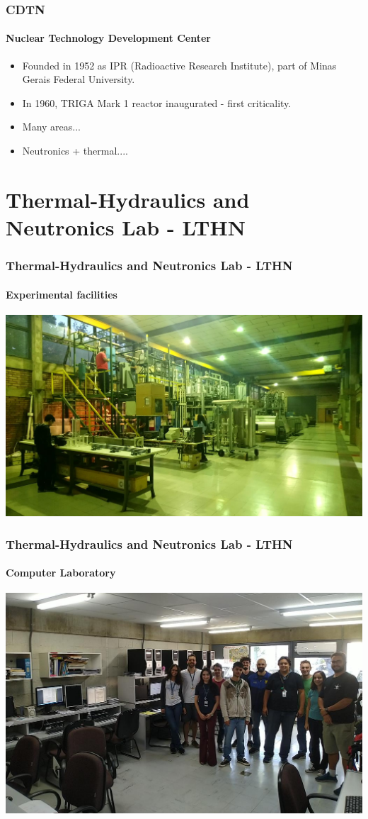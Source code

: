 \documentclass[svgnames,smaller,table]{beamer}
\begin{document}
\begin{frame}
  \frametitle{CDTN}
  \framesubtitle{Nuclear Technology Development Center}
  \begin{itemize}
  \item Founded in 1952 as IPR (Radioactive Research Institute), part of
    Minas Gerais Federal University.
  \item In 1960, TRIGA Mark 1 reactor inaugurated - first criticality.
  \item Many areas...
    \item Neutronics + thermal....
  \end{itemize}
\end{frame}


\section{Thermal-Hydraulics and Neutronics Lab - LTHN}
\begin{frame}
  \frametitle{Thermal-Hydraulics and Neutronics Lab - LTHN}
  \framesubtitle{Experimental facilities}
  \begin{center}
    \includegraphics[scale=0.2]{figuras/labth.jpg}
  \end{center}
\end{frame}

\begin{frame}
  \frametitle{Thermal-Hydraulics and Neutronics Lab - LTHN}
  \framesubtitle{Computer Laboratory}
  \begin{center}
    \includegraphics[scale=0.3]{figuras/lthn-computers-cropped.jpg}
  \end{center}
\end{frame}
\end{document}
